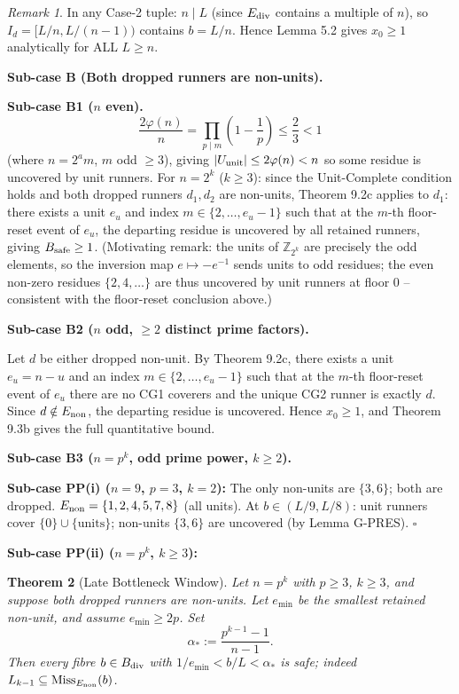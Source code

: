 \documentclass[11pt,a4paper]{article}
\theoremstyle{plain}
\newtheorem{theorem}{Theorem}[section]
\theoremstyle{definition}
\theoremstyle{remark}
\newtheorem{remark}[theorem]{Remark}
\begin{document}
\begin{remark}
In any Case-2 tuple: $n \mid L$ (since $E_{\rm div}$ contains a multiple of $n$), so $I_d = [L/n, L/(n-1))$ contains $b = L/n$. Hence Lemma 5.2 gives $x_0 \geq 1$ analytically for ALL $L \geq n$.

\textbf{Sub-case B (Both dropped runners are non-units).}

\textbf{Sub-case B1 ($n$ even).}
$$\frac{2\varphi(n)}{n} = \prod_{p \mid m}\!\left(1-\frac{1}{p}\right) \leq \frac{2}{3} < 1$$
(where $n = 2^a m$, $m$ odd $\geq 3$), giving $|U_{\rm unit}| \leq 2\varphi(n) < n$ so some residue is uncovered by unit runners. For $n = 2^k$ ($k \geq 3$): since the Unit-Complete condition holds and both dropped runners $d_1, d_2$ are non-units, Theorem 9.2c applies to $d_1$: there exists a unit $e_u$ and index $m \in \{2,\ldots,e_u-1\}$ such that at the $m$-th floor-reset event of $e_u$, the departing residue is uncovered by all retained runners, giving $B_{\rm safe} \geq 1$. (Motivating remark: the units of $\mathbb{Z}_{2^k}$ are precisely the odd elements, so the inversion map $e \mapsto -e^{-1}$ sends units to odd residues; the even non-zero residues $\{2,4,\ldots\}$ are thus uncovered by unit runners at floor $0$ -- consistent with the floor-reset conclusion above.)

\textbf{Sub-case B2 ($n$ odd, $\geq 2$ distinct prime factors).}

Let $d$ be either dropped non-unit. By Theorem 9.2c, there exists a unit $e_u = n-u$ and an index $m \in \{2,\ldots,e_u-1\}$ such that at the $m$-th floor-reset event of $e_u$ there are no CG1 coverers and the unique CG2 runner is exactly $d$. Since $d \notin E_{\rm non}$, the departing residue is uncovered. Hence $x_0 \geq 1$, and Theorem 9.3b gives the full quantitative bound.

\textbf{Sub-case B3 ($n = p^k$, odd prime power, $k \geq 2$).}

\textbf{Sub-case PP(i) ($n=9$, $p=3$, $k=2$):} The only non-units are $\{3,6\}$; both are dropped. $E_{\rm non} = \{1,2,4,5,7,8\}$ (all units). At $b \in (L/9, L/8)$: unit runners cover $\{0\} \cup \{\text{units}\}$; non-units $\{3,6\}$ are uncovered (by Lemma G-PRES). $\square$

\textbf{Sub-case PP(ii) ($n=p^k$, $k \geq 3$):}

\end{remark}


\begin{theorem}[Late Bottleneck Window]
Let $n=p^k$ with $p \geq 3$, $k \geq 3$, and suppose both dropped runners are non-units. Let $e_{\min}$ be the smallest retained non-unit, and assume $e_{\min} \geq 2p$. Set
$$\alpha_* := \frac{p^{k-1}-1}{n-1}.$$
\textit{Then every fibre $b \in B_{\rm div}$ with $1/e_{\min} < b/L < \alpha_*$ is safe; indeed $L_{k-1} \subseteq \mathrm{Miss}_{E_{\rm non}}(b)$.}

\end{theorem}
\end{document}
